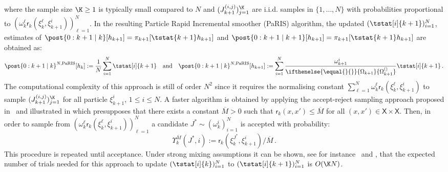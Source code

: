 \documentclass[nolayout]{article}
\newcommand{\eqsp}{\,}
\def\Xset{\mathsf{X}}
\newcommand{\pred}[1]{\pi_{#1}}
\newcommand{\af}[1]{h_{#1}}
\newcommand{\N}{N}
\newcommand{\hkup}{\overline{M}}
\newcommand{\bi}[3]{J_{#1}^{(#2, #3)}}
\newcommand{\eqdef}{\ensuremath{:=}}
\newcommand{\ewght}[2]{\ensuremath{\omega_{#1}^{#2}}}
\newcommand{\epart}[2]{\ensuremath{\xi_{#1}^{#2}}}
\newcommand{\sumwght}[2][]{%
\ifthenelse{\equal{#1}{}}{\ensuremath{\Omega_{#2}}}{\ensuremath{\Omega_{#2}^{(#1)}}}}
\newcommand{\qg}[1]{\mathsf{r}_{#1}}
\begin{document}
where the sample size $\K\ge 1$ is typically small compared to $\N$ and $(\bi{k+1}{i}{j})_{j=1}^{\K}$ are i.i.d. samples in $\{1,\ldots,N\}$ with probabilities proportional to $(\ewght{k}{\ell} \qg{k}(\epart{k}{\ell}, \epart{k+1}{i}))_{\ell=1}^{\N}$. In the resulting Particle Rapid Incremental smoother (PaRIS) algorithm, the updated $(\tstat[i]{k+1})_{i=1}^{\N}$, estimates of $\post{0:k+1 \mid k}[\af{k+1}] = \pred{k + 1 }[\tstat{k+1} \af{k+1}]$ and $\post{0:k+1 \mid k+1}[\af{k+1}] = \pred{k + 1 }[\tstat{k+1} \af{k+1}]$ are obtained as:
\[
\post{0:k+1 \mid k}^{\N,\mathrm{PaRIS}} [\af{k}] \eqdef \frac{1}{\N} \sum_{i=1}^{\N} \tstat[i]{k+1} \quad \mathrm{and}\quad \post{0:k+1 \mid k}^{\N,\textrm{PaRIS}} [\af{k+1}] \eqdef \sum_{i=1}^{\N}\frac{\ewght{k+1}{i}}{\sumwght{k+1}}\tstat[i]{k+1}\eqsp.
\]
The computational complexity of this approach is still of order $\N^2$ since it requires the normalising constant $\sum_{\ell = 1}^\N \ewght{k}{\ell} \qg{k}(\epart{k}{\ell}, \epart{k+1}{i})$ to sample $(\bi{k+1}{i}{j})_{j=1}^{\K}$ for all particle $\epart{k+1}{i}$, $1\le i \le N$. A faster algorithm is obtained by applying the accept-reject sampling approach proposed in~\cite{douc:garivier:moulines:olsson:2010} and illustrated in \cite{dubarry:lecorff:2011} which presupposes that there exists a constant $\hkup > 0$ such that $\qg{k} (x,x') \leq \hkup$ for all $(x, x') \in \Xset\times \Xset$. Then, in order to sample from $(\ewght{k}{\ell} \qg{k} (\epart{k}{\ell}, \epart{k+1}{i}))_{\ell=1}^{\N}$ a candidate $J^\ast \sim (\ewght{k}{i})_{i=1}^{\N}$ is accepted with probability:
\begin{equation}
\label{eq:accept:ratio}
\Upsilon_{k}^{\hkup}(J^*,i)\eqdef \qg{k} (\epart{k}{J^*}, \epart{k+1}{i})/\hkup\eqsp.
\end{equation}
This procedure is repeated until acceptance. Under strong mixing assumptions it can be shown, see for instance~\cite[Proposition 2]{douc:garivier:moulines:olsson:2010} and \cite[Theorem~10]{olsson:westerborn:2014b}, that the expected number of trials needed for this approach to update $(\tstat[i]{k})_{i=1}^{\N}$ to $(\tstat[i]{k+1})_{i=1}^{\N}$ is $O(\K \N)$.





\end{document}
